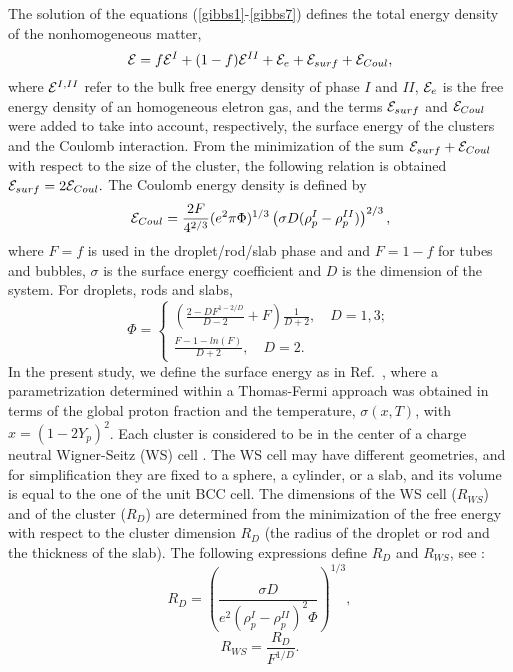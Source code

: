\documentclass[epj]{svjour}
\begin{document}
The solution of the equations (\ref{gibbs1}-\ref{gibbs7}) defines the total
energy density of the nonhomogeneous matter,
\begin{equation}
{\cal E}= f {\cal E}^I + (1-f) {\cal E}^{II} + {\cal E}_e +
{\cal E}_{surf} + {\cal E}_{Coul}, 
\label{totener}
\end{equation}
where ${\cal E}^{I,II} $ refer to the bulk free energy density of
phase $I$ and $II$,  $ {\cal E}_e$ is the free energy
density of an homogeneous eletron gas, and the terms ${\cal E}_{surf}$
and ${\cal E}_{Coul}$ were added to take into account, respectively,  the surface
energy of the clusters and the Coulomb interaction. From the 
minimization of the sum  ${\cal E}_{surf} + {\cal E}_{Coul}$ with respect
to the size of the cluster, the following relation is obtained
\cite{Maruyama2005}
${\cal E}_{surf} = 2 {\cal E}_{Coul}.$
The Coulomb energy density is defined by \cite{Ravenhall-83,Hashimoto-84,Maruyama2005}
\begin{equation}
{\cal E}_{Coul}=\frac{2 F}{4^{2/3}}(e^2 \pi \Phi)^{1/3} 
\left(\sigma D (\rho_p^I-\rho_p^{II})\right)^{2/3},
\end{equation}
where $F=f$ is used in the droplet/rod/slab phase and  and $F=1-f$ for
tubes and bubbles, 
 $\sigma$ is the surface energy coefficient and 
$D$ is the dimension of the system. For droplets, rods and slabs, \cite{Ravenhall-83,Hashimoto-84}
\begin{equation}
\Phi=\begin{cases}
\left(\frac{2-D F^{1-2/D}}{D-2}+F \right) \frac{1}{D+2}, \quad D=1,3;\\
 \frac{F-1-ln(F)}{D+2}, \quad D=2. \end{cases}
\end{equation}
In the present study, we define the surface energy as in Ref.~\cite{pasta_alpha}, where a parametrization determined within a Thomas-Fermi approach was obtained in terms of the global proton fraction and the temperature,
$\sigma (x,T)$, with $x=(1-2 Y_p)^2$. Each
cluster is considered to be in the center of a charge neutral 
Wigner-Seitz  (WS) cell \cite{Maruyama2005,Shen98}.  
The WS cell may have different geometries, and for
simplification they are fixed to a sphere, a cylinder, or a slab, and its volume is equal to the one of the unit
BCC cell. The dimensions of the WS cell ($R_{WS}$)  and of the cluster
($R_D$) are
determined from the  minimization of the free energy with respect to the
cluster dimension  $R_D$ (the radius of the
droplet or rod and the thickness of the slab). The following
expressions define $R_D$ and $R_{WS}$, see \cite{Ravenhall-83,Maruyama2005}:
\begin{equation}
R_D=\left( \frac{\sigma D}{e^2 (\rho_p^I
- \rho_p^{II})^2 \Phi} \right)^{1/3},
\end{equation}
\begin{equation}
R_{WS}=\frac{R_D}{F^{1/D}}. 
\end{equation}
\end{document}
